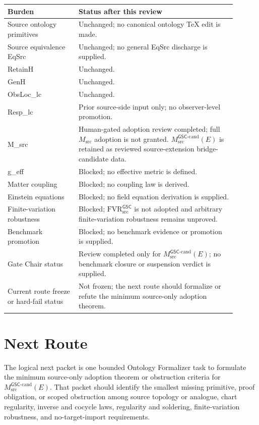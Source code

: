 \documentclass[11pt]{article}
\newcommand{\GSC}{\mathsf{GSC}}
\newcommand{\Msrc}{M_{\mathrm{src}}}
\newcommand{\Mgsccand}{M_{\mathrm{src}}^{\GSC\mbox{-}\mathrm{cand}}}
\newcommand{\FVR}{\mathrm{FVR}_{\mathrm{src}}^{\GSC}}
\begin{document}
\begin{longtable}{|p{0.28\linewidth}|p{0.62\linewidth}|}
\hline
\textbf{Burden} & \textbf{Status after this review} \\
\hline
Source ontology primitives & Unchanged; no canonical ontology TeX edit is made. \\
\hline
Source equivalence EqSrc & Unchanged; no general EqSrc discharge is supplied. \\
\hline
RetainH & Unchanged. \\
\hline
GenH & Unchanged. \\
\hline
ObsLoc\_lc & Unchanged. \\
\hline
Resp\_lc & Prior source-side input only; no observer-level promotion. \\
\hline
M\_src & Human-gated adoption review completed; full \(\Msrc\) adoption is not granted. \(\Mgsccand(E)\) is retained as reviewed source-extension bridge-candidate data. \\
\hline
g\_eff & Blocked; no effective metric is defined. \\
\hline
Matter coupling & Blocked; no coupling law is derived. \\
\hline
Einstein equations & Blocked; no field equation derivation is supplied. \\
\hline
Finite-variation robustness & Blocked; \(\FVR\) is not adopted and arbitrary finite-variation robustness remains unproved. \\
\hline
Benchmark promotion & Blocked; no benchmark evidence or promotion is supplied. \\
\hline
Gate Chair status & Review completed only for \(\Mgsccand(E)\); no benchmark closure or suspension verdict is supplied. \\
\hline
Current route freeze or hard-fail status & Not frozen; the next route should formalize or refute the minimum source-only adoption theorem. \\
\hline
\end{longtable}

\section{Next Route}

The logical next packet is one bounded Ontology Formalizer task to formulate
the minimum source-only adoption theorem or obstruction criteria for
\(\Mgsccand(E)\). That packet should identify the smallest missing primitive,
proof obligation, or scoped obstruction among source topology or analogue,
chart regularity, inverse and cocycle laws, regularity and soldering,
finite-variation robustness, and no-target-import requirements.
\end{document}
